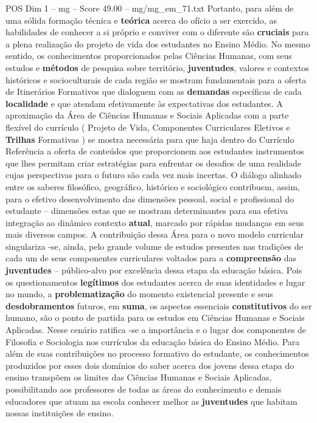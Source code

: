 \begin{textsample}{POS Dim 1 – mg – Score 49.00 – mg/mg\_em\_71.txt}
Portanto, para além de uma sólida formação técnica e \textbf{teórica} acerca do ofício a ser exercido, as habilidades de conhecer a si próprio e conviver com o diferente são \textbf{cruciais} para a plena realização do projeto de vida dos estudantes no Ensino Médio.
No mesmo sentido, os conhecimentos proporcionados pelas Ciências Humanas, com seus estudos e \textbf{métodos} de pesquisa sobre território, \textbf{juventudes}, valores e contextos históricos e socioculturais de cada região se mostram fundamentais para a oferta de Itinerários Formativos que dialoguem com as \textbf{demandas} específicas de cada \textbf{localidade} e que atendam efetivamente às expectativas dos estudantes.
A aproximação da Área de Ciências Humanas e Sociais Aplicadas com a parte flexível do currículo ( Projeto de Vida, Componentes Curriculares Eletivos e \textbf{Trilhas} Formativas ) se mostra necessária para que haja dentro do Currículo Referência a oferta de conteúdos que proporcionem aos estudantes instrumentos que lhes permitam criar estratégias para enfrentar os desafios de uma realidade cujas perspectivas para o futuro são cada vez mais incertas.
O diálogo alinhado entre os saberes filosófico, geográfico, histórico e sociológico contribuem, assim, para o efetivo desenvolvimento das dimensões pessoal, social e profissional do estudante – dimensões estas que se mostram determinantes para sua efetiva integração ao dinâmico contexto \textbf{atual}, marcado por rápidas mudanças em seus mais diversos campos.
A contribuição dessa Área para o novo modelo curricular singulariza -se, ainda, pelo grande volume de estudos presentes nas tradições de cada um de seus componentes curriculares voltados para a \textbf{compreensão} das \textbf{juventudes} – público-alvo por excelência dessa etapa da educação básica.
Pois os questionamentos \textbf{legítimos} dos estudantes acerca de suas identidades e lugar no mundo, a \textbf{problematização} do momento existencial presente e seus \textbf{desdobramentos} futuros, em \textbf{suma}, os aspectos essenciais \textbf{constitutivos} do ser humano, são o ponto de partida para os estudos em Ciências Humanas e Sociais Aplicadas.
Nesse cenário ratifica -se a importância e o lugar dos componentes de Filosofia e Sociologia nos currículos da educação básica do Ensino Médio.
Para além de suas contribuições no processo formativo do estudante, os conhecimentos produzidos por esses dois domínios do saber acerca dos jovens dessa etapa do ensino transpõem os limites das Ciências Humanas e Sociais Aplicadas, possibilitando aos professores de todas as áreas do conhecimento e demais educadores que atuam na escola conhecer melhor as \textbf{juventudes} que habitam nossas instituições de ensino.

\end{textsample}

